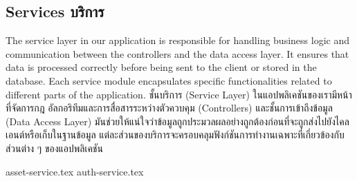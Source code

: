 \subsection{\ifenglish Services \else บริการ \fi}

\ifenglish
The service layer in our application is responsible for handling business logic and communication between the controllers and the data access layer. It ensures that data is processed correctly before being sent to the client or stored in the database. Each service module encapsulates specific functionalities related to different parts of the application.
\else
ชั้นบริการ (Service Layer) ในแอปพลิเคชันของเรามีหน้าที่จัดการกฎ อัลกอริทึมและการสื่อสารระหว่างตัวควบคุม (Controllers) และชั้นการเข้าถึงข้อมูล (Data Access Layer) มันช่วยให้แน่ใจว่าข้อมูลถูกประมวลผลอย่างถูกต้องก่อนที่จะถูกส่งไปยังไคลเอนต์หรือเก็บในฐานข้อมูล แต่ละส่วนของบริการจะครอบคลุมฟังก์ชันการทำงานเฉพาะที่เกี่ยวข้องกับส่วนต่าง ๆ ของแอปพลิเคชัน
\fi

\newcommand{\serviceDir}{chapters/approach/backend/services}
{asset-service.tex}
{auth-service.tex}